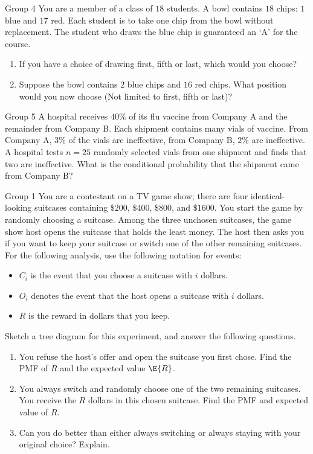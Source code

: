 \documentclass{article}
\theoremstyle{plain}
\theoremstyle{definition}
\theoremstyle{remark}
\begin{document}
\begin{problem}
    {Group 4}
    You are a member of a class of $18$ students. A bowl contains $18$ chips: $1$ blue and $17$ red. Each student is to take one chip from the bowl without replacement. The student who draws the blue chip is guaranteed an `A' for the course.
    \begin{enumerate}
        \item If you have a choice of drawing first, fifth or last, which would you choose?
        \item Suppose the bowl contains $2$ blue chips and $16$ red chips. What position would you now choose (Not limited to first, fifth or last)?
    \end{enumerate}
\end{problem}

\begin{problem}
    {Group 5}
    A hospital receives $40\%$ of its flu vaccine from Company A and the remainder from Company B. Each shipment contains many vials of vaccine. From Company A, $3\%$ of the vials are ineffective, from Company B, $2\%$ are ineffective. A hospital tests $n=25$ randomly selected vials from one shipment and finds that two are ineffective. What is the conditional probability that the shipment came from Company B?
\end{problem}
\begin{problem}
    {Group 1}
    You are a contestant on a TV game show; there are four identical-looking suitcases containing $\$200$, $\$400$, $\$800$, and $\$1600$. You start the game by randomly choosing a suitcase. Among the three unchosen suitcases, the game show host opens the suitcase that holds the least money. The host then asks you if you want to keep your suitcase or switch one of the other remaining suitcases. For the following analysis, use the following notation for events:
    \begin{itemize}
        \item $C_i$ is the event that you choose a suitcase with $i$ dollars.
        \item $O_i$ denotes the event that the host opens a suitcase with $i$ dollars.
        \item $R$ is the reward in dollars that you keep.
    \end{itemize}
    Sketch a tree diagram for this experiment, and answer the following questions.
    \begin{enumerate}
        \item You refuse the host’s offer and open the suitcase you first chose. Find the PMF of $R$ and the expected value $\E{R}$.
        \item You always switch and randomly choose one of the two remaining suitcases. You receive the $R$ dollars in this chosen suitcase. Find the PMF and expected value of $R$.
        \item Can you do better than either always switching or always staying with your original choice? Explain.
    \end{enumerate}
\end{problem}
\end{document}
